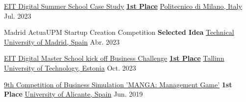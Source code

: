 



\begin{cvhonors}

  \cvhonor
    {\href{https://www.instagram.com/p/Cu9dOXZswlK/?img_index=9}{EIT Digital Summer School Case Study}} %
    {\href{http://bit.ly/3u6Lm2b}{\hspace*{1mm}\textbf{1st Place}}} %
    {\href{https://www.polimi.it/}{Politecnico di Milano, Italy}} %
    {Jul. 2023} %
    
  \cvhonor
	{Madrid ActuaUPM Startup Creation Competition} %
	{\hspace*{1mm}\textbf{Selected Idea}} %
	{\href{https://www.cedint.upm.es/en/article/take-part-20th-actuaupm-competition}{Technical University of Madrid, Spain}} %
	{Abr. 2023} %
	
  \cvhonor
	{\href{https://www.eitdigital.eu/newsroom/news/2022/eit-digital-master-school-kicks-off-academic-year-2022/}{EIT Digital Master School kick off Business Challenge}} %
	{\hspace*{1mm}\href{https://bit.ly/4aH8i7z}{\textbf{1st Place}}} %
	{\href{https://taltech.ee/en/}{Tallinn University of Technology, Estonia}} %
	{Oct. 2023} %

  \cvhonor
	{\href{https://economicas.ua.es/es/actividades-y-eventos/juego-de-simulacion/ediciones-anteriores/juego-de-simulacion-empresarial-2018-19.html}{9th Competition of Business Simulation 'MANGA: Management Game'}} %
	{\hspace*{1mm}\textbf{1st Place}} %
	{\href{https://www.ua.es/en/}{University of Alicante, Spain}} %
	{Jun. 2019} %

\end{cvhonors}


